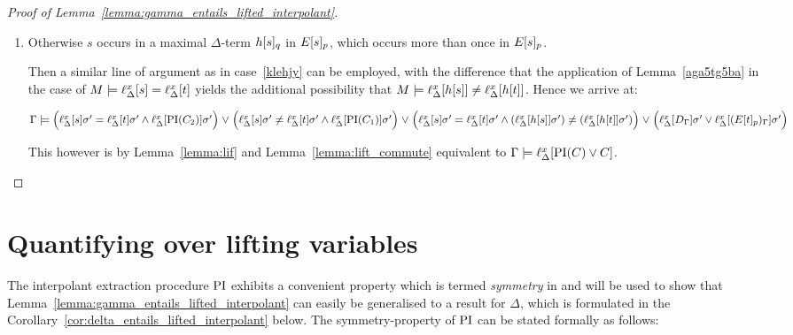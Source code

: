 \begin{proof}[Proof of Lemma~\ref{lemma:gamma_entails_lifted_interpolant}]
\begin{description}
\begin{enumerate}
					\item Otherwise $s$ occurs in a maximal $\Delta$-term $h{[s]_{q}}$ in $E{[s]_{p}}$, which occurs more than once in $E{[s]_{p}}$.

						Then a similar line of argument as in case~\ref{klehjy} can be employed, with the difference that the application of Lemma~\ref{aga5tg5ba} in the case of $M\models \ell_{\Delta}^{x}[s] = \ell_{\Delta}^{x}[t]$ yields the additional possibility that 
			$M\models \ell_{\Delta}^{x}[h[s]] \neq \ell_{\Delta}^{x}[h[t]]$.
 Hence we arrive at:

				$\Gamma \models
				\Big(\ell_{\Delta}^{x}[s]\sigma'=\ell_{\Delta}^{x}[t]\sigma' \land \ell_{\Delta}^{x}[\operatorname{PI}(C_2)]\sigma'\Big) \;{\lor}\;\allowbreak
				\Big(\ell_{\Delta}^{x}[s]\sigma'\neq\ell_{\Delta}^{x}[t]\sigma' \land \ell_{\Delta}^{x}[\operatorname{PI}(C_1)]\sigma'\Big) \;{\lor}\;\allowbreak
				\Big(\ell_{\Delta}^{x}[s]\sigma'=\ell_{\Delta}^{x}[t]\sigma' \land (\ell_{\Delta}^{x}[h[s]]\sigma') \neq (\ell_{\Delta}^{x}[h[t]]\sigma' )\Big) \;{\lor}\;\allowbreak
				\Big(\ell_{\Delta}^{x}[D_\Gamma]\sigma' \lor \ell_{\Delta}^{x}[(E{[t]_{p}})_\Gamma]\sigma'\Big)$

				This however is by Lemma~\ref{lemma:lif} and Lemma~\ref{lemma:lift_commute} equivalent to $\Gamma \entails \lifdelta{\PI(C) \lor\nolinebreak C}$.
				\qedhere
		\end{enumerate}
\end{description}
\end{proof}



\section{Quantifying over lifting variables}


The interpolant extraction procedure $\operatorname{PI}$ exhibits a convenient property which is termed \emph{symmetry} in \cite[Definition 5]{interpolantStrenth} and will be used to show that Lemma~\ref{lemma:gamma_entails_lifted_interpolant} can easily be generalised to a result for $\Delta$, which is formulated in the Corollary~\ref{cor:delta_entails_lifted_interpolant} below.
The symmetry-property of $\operatorname{PI}$ can be stated formally as follows:

